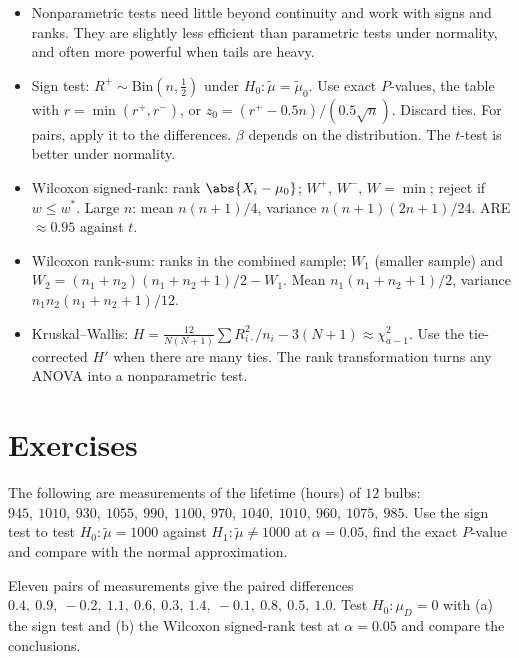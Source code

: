\begin{summarybox}
\begin{itemize}
  \item Nonparametric tests need little beyond continuity and work with signs and ranks. They are slightly less efficient than parametric tests under normality, and often more powerful when tails are heavy.
  \item Sign test: $R^+\sim\mathrm{Bin}(n,\tfrac12)$ under $H_0:\tilde\mu=\tilde\mu_0$. Use exact $P$-values, the table with $r=\min(r^+,r^-)$, or $z_0=(r^+-0.5n)/(0.5\sqrt n)$. Discard ties. For pairs, apply it to the differences. $\beta$ depends on the distribution. The $t$-test is better under normality.
  \item Wilcoxon signed-rank: rank $\abs{X_i-\mu_0}$; $W^+$, $W^-$, $W=\min$; reject if $w\le w^*$. Large $n$: mean $n(n+1)/4$, variance $n(n+1)(2n+1)/24$. ARE $\approx0.95$ against $t$.
  \item Wilcoxon rank-sum: ranks in the combined sample; $W_1$ (smaller sample) and $W_2=(n_1+n_2)(n_1+n_2+1)/2-W_1$. Mean $n_1(n_1+n_2+1)/2$, variance $n_1n_2(n_1+n_2+1)/12$.
  \item Kruskal--Wallis: $H=\frac{12}{N(N+1)}\sum R_{i\cdot}^2/n_i-3(N+1)\approx\chi^2_{a-1}$. Use the tie-corrected $H'$ when there are many ties. The rank transformation turns any ANOVA into a nonparametric test.
\end{itemize}
\end{summarybox}

\section{Exercises}

\begin{exercise}
The following are measurements of the lifetime (hours) of $12$ bulbs: $945,\ 1010,\ 930,\ 1055,\ 990,\ 1100,\ 970,\ 1040,\ 1010,\ 960,\ 1075,\ 985$. Use the sign test to test $H_0:\tilde\mu=1000$ against $H_1:\tilde\mu\ne1000$ at $\alpha=0.05$, find the exact $P$-value and compare with the normal approximation.
\end{exercise}

\begin{exercise}
Eleven pairs of measurements give the paired differences $0.4,\ 0.9,\ -0.2,\ 1.1,\ 0.6,\ 0.3,\ 1.4,\ -0.1,\ 0.8,\ 0.5,\ 1.0$. Test $H_0:\mu_D=0$ with (a) the sign test and (b) the Wilcoxon signed-rank test at $\alpha=0.05$ and compare the conclusions.
\end{exercise}

